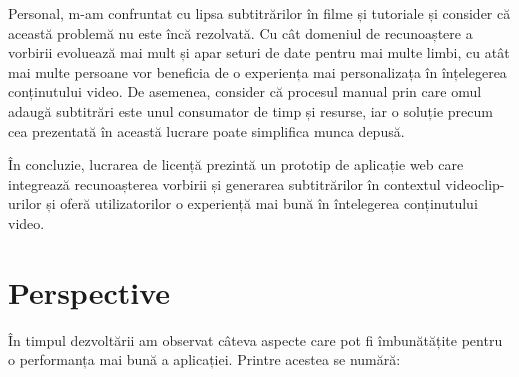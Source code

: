 \par
Personal, m-am confruntat cu lipsa subtitrărilor în filme și tutoriale și consider că această
problemă nu este încă rezolvată. Cu cât domeniul de recunoaștere a vorbirii evoluează mai mult
și apar seturi de date pentru mai multe limbi, cu atât mai multe persoane vor beneficia de o 
experiența mai personalizața în înțelegerea conținutului video. De asemenea, consider că procesul
manual prin care omul adaugă subtitrări este unul consumator de timp și resurse, iar o soluție
precum cea prezentată în această lucrare poate simplifica munca depusă.
\par
În concluzie, lucrarea de licență prezintă un prototip de aplicație web care integrează
recunoașterea vorbirii și generarea subtitrărilor în contextul videoclip-urilor și oferă
utilizatorilor o experiență mai bună în întelegerea conținutului video.

\section{Perspective}
\par
În timpul dezvoltării am observat câteva aspecte care pot fi îmbunătățite pentru o 
performanța mai bună a aplicației. Printre acestea se numără:


